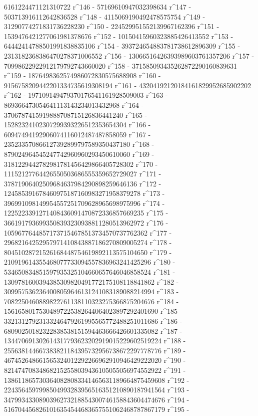        6161224471121310722 r^146 - 57169610947032398634 r^147 - 
       503713916112642836528 r^148 - 4115069190492478575754 r^149 - 
       31290774271831736228230 r^150 - 
       224529951552139967162396 r^151 - 
       1539476421277061981378676 r^152 - 
       10150415960323885426413552 r^153 - 
       64442414788501991838835106 r^154 - 
       393724654883781738612896309 r^155 - 
       2313182368386470278371006552 r^156 - 
       13066516426393989603761357206 r^157 - 
       70998622922912179792743660020 r^158 - 
       371585093435262872290160839631 r^159 - 
       1876498362574986072830575688908 r^160 - 
       9156758209442201334735619308194 r^161 - 
       43204192120184161829952685902202 r^162 - 
       197109149479370176541161928509003 r^163 - 
       869366473054641113143234013432968 r^164 - 
       3706787415919888708715126836441240 r^165 - 
       15282324102307299393226512353654304 r^166 - 
       60947494192906074116012487487858059 r^167 - 
       235233570866127392899797589350437180 r^168 - 
       879024964545247742960960293450610060 r^169 - 
       3181229442782981781456429866405728302 r^170 - 
       11152127764426550503686555359652729027 r^171 - 
       37871906402509684637984290898259646136 r^172 - 
       124585391678460975187160983271958379278 r^173 - 
       396991098149954557251709628965698975996 r^174 - 
       1225223391271408436091470872336857669235 r^175 - 
       3661917936993508393230938811280513962972 r^176 - 
       10596776448571737154678513734570737762362 r^177 - 
       29682164252957971410843887186270809005274 r^178 - 
       80451028721526168448754619892113575104650 r^179 - 
       210919614355468077733094557836963241425296 r^180 - 
       534650834851597935325104660657646046858524 r^181 - 
       1309781600394385309820491772175108118841862 r^182 - 
       3099575362364008059646131241083189088214994 r^183 - 
       7082250460889822761138110323275366875204676 r^184 - 
       15616580175304897225382644064023897292401690 r^185 - 
       33213127923133246479261995565772488251011686 r^186 - 
       68090250182322838538151594463666426601335082 r^187 - 
       134470691302614317793623202919015229602519224 r^188 - 
       255638144667383821184395732956738672297778776 r^189 - 
       467452648661565324012292266962910946429222020 r^190 - 
       821474708348682152558039436105055056974552922 r^191 - 
       1386118657303640828083341465631189664875459608 r^192 - 
       2243564597998504993283956516351210890187941564 r^193 - 
       3479934330890396273218854300746158843604474676 r^194 - 
       5167044568261016354544683657551062468787867179 r^195 - 
